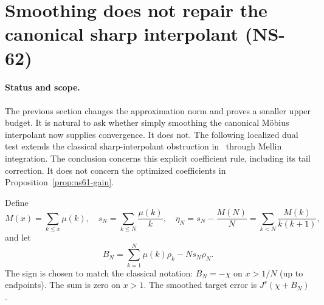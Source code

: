 \section{Smoothing does not repair the canonical sharp interpolant (NS-62)}
\label{sec:ns62-sharp-interpolant}

\paragraph{Status and scope.}
The previous section changes the approximation norm and proves a smaller
upper budget. It is natural to ask whether simply smoothing the canonical
M\"obius interpolant now supplies convergence. It does not. The following
localized dual test extends the classical sharp-interpolant obstruction
in~\cite[Section 4]{BaezDuarte2000Arithmetic} through Mellin integration.
The conclusion concerns this explicit coefficient rule, including its
tail correction. It does not concern the optimized coefficients in
Proposition~\ref{prop:ns61-gain}.

Define
\[
 M(x)=\sum_{k\leq x}\mu(k),\quad
 s_N=\sum_{k\leq N}\frac{\mu(k)}k,\quad
 \eta_N=s_N-\frac{M(N)}N
       =\sum_{k<N}\frac{M(k)}{k(k+1)},
\]
and let
\begin{equation}
 B_N=\sum_{k=1}^N\mu(k)\rho_k-Ns_N\rho_N.
 \label{eq:ns62-natural-interpolant}
\end{equation}
The sign is chosen to match the classical notation: $B_N=-\chi$
on $x>1/N$ (up to endpoints). The sum is zero on $x>1$.
The smoothed target error is $J^r(\chi+B_N)$.

